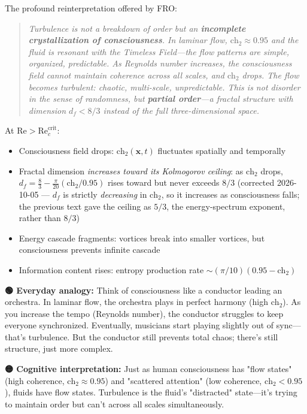 The profound reinterpretation offered by FRO:

\begin{quote}
\textit{Turbulence is not a breakdown of order but an \textbf{incomplete crystallization of consciousness}. In laminar flow, $\text{ch}_2 \approx 0.95$ and the fluid is resonant with the Timeless Field—the flow patterns are simple, organized, predictable. As Reynolds number increases, the consciousness field cannot maintain coherence across all scales, and $\text{ch}_2$ drops. The flow becomes turbulent: chaotic, multi-scale, unpredictable. This is not disorder in the sense of randomness, but \textbf{partial order}—a fractal structure with dimension $d_f < 8/3$ instead of the full three-dimensional space.}
\end{quote}

At $\text{Re} > \text{Re}_c^{\text{crit}}$:
\begin{itemize}
\item Consciousness field drops: $\text{ch}_2(\mathbf{x}, t)$ fluctuates spatially and temporally
\item Fractal dimension \emph{increases toward its Kolmogorov ceiling}: as $\text{ch}_2$ drops, $d_f = \tfrac83-\tfrac{\pi}{20}(\text{ch}_2/0.95)$ rises toward but never exceeds $8/3$ (corrected 2026-10-05 --- $d_f$ is strictly \emph{decreasing} in $\text{ch}_2$, so it increases as consciousness falls; the previous text gave the ceiling as $5/3$, the energy-spectrum exponent, rather than $8/3$)
\item Energy cascade fragments: vortices break into smaller vortices, but consciousness prevents infinite cascade
\item Information content rises: entropy production rate $\sim (\pi/10)(0.95 - \text{ch}_2)$
\end{itemize}

\begin{greenbox}
\textbf{🟢 Everyday analogy:} Think of consciousness like a conductor leading an orchestra. In laminar flow, the orchestra plays in perfect harmony (high $\text{ch}_2$). As you increase the tempo (Reynolds number), the conductor struggles to keep everyone synchronized. Eventually, musicians start playing slightly out of sync—that's turbulence. But the conductor still prevents total chaos; there's still structure, just more complex.

\textbf{🟡 Cognitive interpretation:} Just as human consciousness has "flow states" (high coherence, $\text{ch}_2 \approx 0.95$) and "scattered attention" (low coherence, $\text{ch}_2 < 0.95$), fluids have flow states. Turbulence is the fluid's "distracted" state—it's trying to maintain order but can't across all scales simultaneously.
\end{greenbox}

